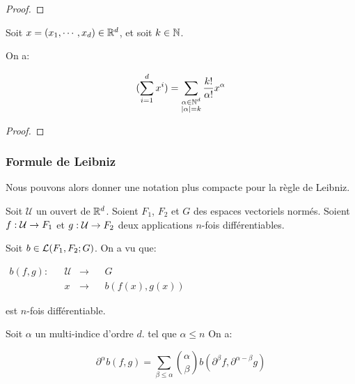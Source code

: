 \ifdefined\outputproof
\begin{proof}

\end{proof}
\fi

\begin{proposition}
	Soit $x = (x_{1}, \cdots, x_{d}) \in \mathbb{R}^{d}$, et soit $k \in \mathbb{N}$.

	On a:

	\begin{equation*}
		\displaystyle (\sum_{i = 1}^{d} x^{i}) = \sum_{\substack{\alpha \in
			\mathbb{N}^{d} \\ |\alpha| = k}} \frac{k!}{\alpha!}
			x^{\alpha}
	\end{equation*}
\end{proposition}

\ifdefined\outputproof
\begin{proof}

\end{proof}
\fi

\subsubsection{Formule de Leibniz}
Nous pouvons alors donner une notation plus compacte pour la règle de Leibniz.

Soit $\mathcal{U}$ un ouvert de $\mathbb{R}^{d}$.
Soient $F_{1}$, $F_{2}$ et $G$ des espaces vectoriels normés.
Soient $f : \mathcal{U} \rightarrow F_{1}$ et
$g : \mathcal{U} \rightarrow F_{2}$ deux applications $n$-fois différentiables.

Soit $b \in \mathcal{L}(F_{1}, F_{2}; G)$.
On a vu que:

\begin{center}
$
	\begin{aligned}
		b(f, g) : 	& &\mathcal{U} &\rightarrow& 	&G \\
					& &x			&\rightarrow& 	&b(f(x), g(x))
	\end{aligned}
$
\end{center}
est $n$-fois différentiable.

\begin{proposition}
	Soit $\alpha$ un multi-indice d'ordre $d$. tel que $\alpha \leq n$
	On a:

	\begin{equation*}
		\partial^{\alpha} b(f, g) = \displaystyle \sum_{\beta \leq \alpha}
		\binom{\alpha}{\beta} b(\partial^{\beta}f, \partial^{\alpha - \beta}
		g)
	\end{equation*}
\end{proposition}

